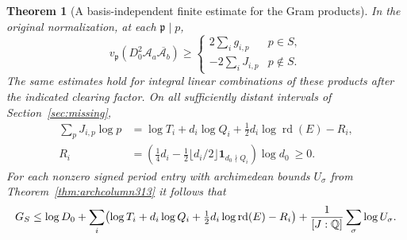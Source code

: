 \documentclass[a4paper,11pt]{article}
\newtheorem{theorem}[proposition]{Theorem}
\theoremstyle{definition}
\theoremstyle{remark}
\numberwithin{equation}{section}
\begin{document}
\begin{theorem}[A basis-independent finite estimate for the Gram products]\leavevmode
\label{thm:gramheight314}
In the original normalization, at each \(\mathfrak p\mid p\),
\[
 v_{\mathfrak p}(D_0^2\mathcal A_a\overline{\mathcal A_b})
 \ge
 \begin{cases}
       2\sum_i g_{i,p} &p\in S,\\
      -2\sum_i J_{i,p} &p\notin S .
 \end{cases}
\]
The same estimates hold for integral linear combinations of
these products after the indicated clearing factor. On all
sufficiently distant intervals of Section~\ref{sec:missing},
\[
 \begin{split}
 \sum_p J_{i,p}\log p
   &=\log T_i+d_i\log Q_i+
                 \tfrac12d_i\log\operatorname{rd}(E)-R_i,\\
 R_i&=\left(\tfrac14d_i-
  \tfrac12\lfloor d_i/2\rfloor\mathbf1_{d_0\nmid Q_i}\right)\log d_0
 \ \ge0 .
 \end{split}
\]
For each nonzero signed period entry with archimedean bounds
\(U_\sigma\) from Theorem~\ref{thm:archcolumn313} it follows that
\[
 G_S\le\log D_0+\sum_i
 \bigl(\log T_i+d_i\log Q_i+\tfrac12d_i\log\operatorname{rd}(E)-R_i\bigr)
               +\frac1{[J:\mathbb Q]}\sum_\sigma\log U_\sigma .
\]
\end{theorem}
\end{document}
